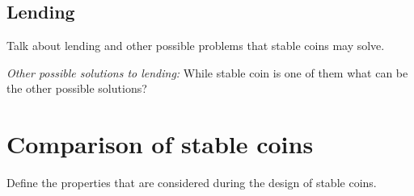 \subsection{Lending}
Talk about lending and other possible problems that stable coins may solve.

\textit{Other possible solutions to lending:} While stable coin is one of them what can be the other possible solutions?

\section{Comparison of stable coins}
Define the properties that are considered during the design of stable coins. 




